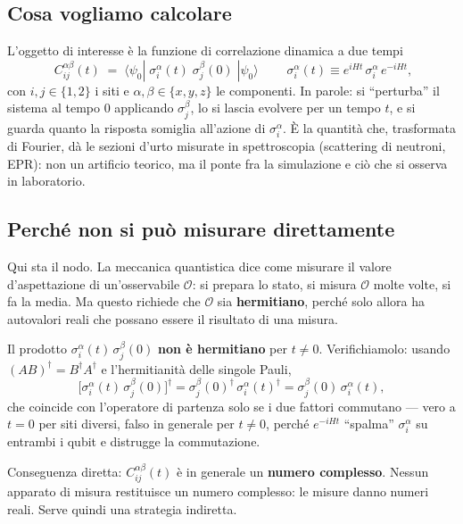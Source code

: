 \documentclass[11pt,a4paper]{article}
\begin{document}
\subsection{Cosa vogliamo calcolare}

L'oggetto di interesse è la funzione di correlazione dinamica a due tempi
\begin{equation}
\boxed{\;C_{ij}^{\alpha\beta}(t) \;=\; \langle\psi_0|\;\sigma_i^\alpha(t)\;\sigma_j^\beta(0)\;|\psi_0\rangle\;}
\qquad
\sigma_i^\alpha(t)\equiv e^{iHt}\,\sigma_i^\alpha\,e^{-iHt},
\label{eq:Cdef}
\end{equation}
con $i,j\in\{1,2\}$ i siti e $\alpha,\beta\in\{x,y,z\}$ le componenti. In parole: si
``perturba'' il sistema al tempo $0$ applicando $\sigma_j^\beta$, lo si lascia evolvere per un
tempo $t$, e si guarda quanto la risposta somiglia all'azione di $\sigma_i^\alpha$. È la
quantità che, trasformata di Fourier, dà le sezioni d'urto misurate in spettroscopia (scattering
di neutroni, EPR): non un artificio teorico, ma il ponte fra la simulazione e ciò che si osserva
in laboratorio.

\subsection{Perché non si può misurare direttamente}

Qui sta il nodo. La meccanica quantistica dice come misurare il valore d'aspettazione di
un'osservabile $\mathcal O$: si prepara lo stato, si misura $\mathcal O$ molte volte, si fa la
media. Ma questo richiede che $\mathcal O$ sia \textbf{hermitiano}, perché solo allora ha
autovalori reali che possano essere il risultato di una misura.

Il prodotto $\sigma_i^\alpha(t)\,\sigma_j^\beta(0)$ \textbf{non è hermitiano} per $t\neq0$.
Verifichiamolo: usando $(AB)^\dagger=B^\dagger A^\dagger$ e l'hermitianità delle singole Pauli,
\begin{equation}
\big[\sigma_i^\alpha(t)\,\sigma_j^\beta(0)\big]^\dagger
= \sigma_j^\beta(0)^\dagger\,\sigma_i^\alpha(t)^\dagger
= \sigma_j^\beta(0)\,\sigma_i^\alpha(t),
\end{equation}
che coincide con l'operatore di partenza solo se i due fattori commutano --- vero a $t=0$ per
siti diversi, falso in generale per $t\neq0$, perché $e^{-iHt}$ ``spalma'' $\sigma_i^\alpha$ su
entrambi i qubit e distrugge la commutazione.

Conseguenza diretta: $C_{ij}^{\alpha\beta}(t)$ è in generale un \textbf{numero complesso}. Nessun
apparato di misura restituisce un numero complesso: le misure danno numeri reali. Serve quindi
una strategia indiretta.
\end{document}
